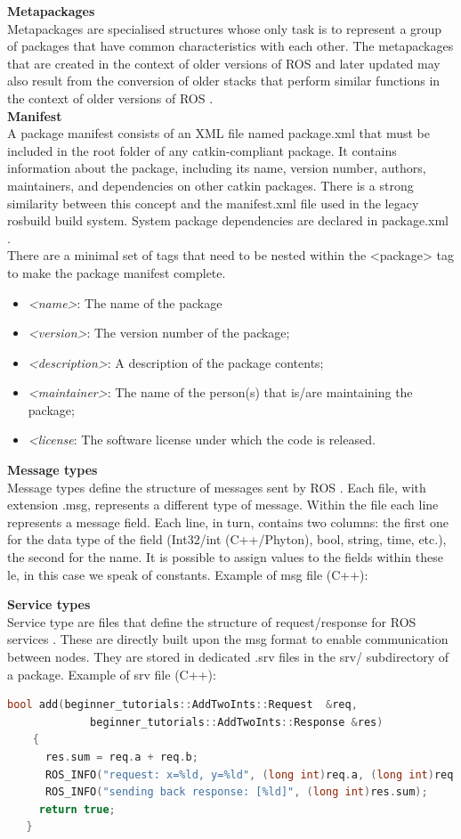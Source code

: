 \textbf{Metapackages}\\
Metapackages are specialised structures whose only task is to represent a group of packages that have common characteristics with each other. The metapackages that are created in the context of older versions of ROS and later updated may also result from the conversion of older stacks that perform similar functions in the context of older versions of ROS \citet{rosmetapackages}.\\
\newline
\textbf{Manifest}\\
A package manifest consists of an XML file named package.xml that must be included in the root folder of any catkin-compliant package. It contains information about the package, including its name, version number, authors, maintainers, and dependencies on other catkin packages. There is a strong similarity between this concept and the manifest.xml file used in the legacy rosbuild build system. System package dependencies are declared in package.xml \citet{rosmanifest}.\\
\newpage
There are a minimal set of tags that need to be nested within the <package> tag to make the package manifest complete.
\begin{itemize}
    \item \textit{<name>}: The name of the package
    \item \textit{<version>}: The version number of the package;
    \item \textit{<description>}: A description of the package contents;
    \item \textit{<maintainer>}: The name of the person(s) that is/are maintaining the package;
    \item \textit{<license}: The software license under which the code is released.
\end{itemize}
\textbf{Message types}\\
Message types define the structure of messages sent by ROS \citet{rosmsg}. Each file, with extension .msg, represents a different type of message. Within the file each line represents a message field. Each line, in turn, contains two columns: the first one for the data type of the field
(Int32/int (C++/Phyton), bool, string, time, etc.), the second for the name. It is possible to assign values to the fields within these le, in this case we speak of constants. Example of msg file (C++):

\textbf{Service types}\\
Service type are files that define the structure of request/response for ROS services \citet{rossrv}.
These are directly built upon the msg format to enable communication between nodes. They are stored in dedicated .srv files in the srv/ subdirectory of a package.
Example of srv file (C++):
\begin{lstlisting}[language=C++]
 bool add(beginner_tutorials::AddTwoInts::Request  &req,
             beginner_tutorials::AddTwoInts::Response &res)
    {
      res.sum = req.a + req.b;
      ROS_INFO("request: x=%ld, y=%ld", (long int)req.a, (long int)req.b);
      ROS_INFO("sending back response: [%ld]", (long int)res.sum);
     return true;
   }
\end{lstlisting}

